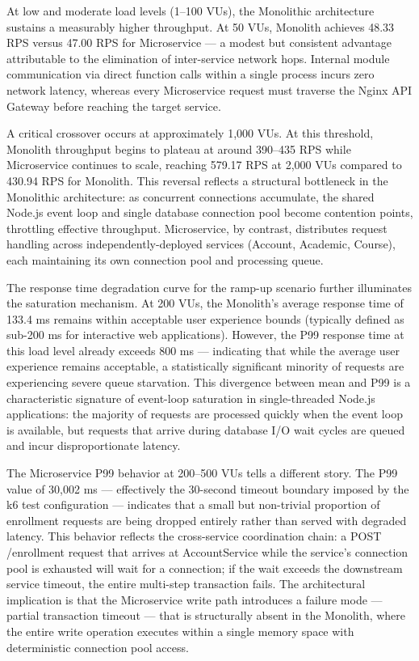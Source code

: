 At low and moderate load levels (1–100 VUs), the Monolithic architecture sustains a measurably higher throughput. At 50 VUs, Monolith achieves 48.33 RPS versus 47.00 RPS for Microservice — a modest but consistent advantage attributable to the elimination of inter-service network hops. Internal module communication via direct function calls within a single process incurs zero network latency, whereas every Microservice request must traverse the Nginx API Gateway before reaching the target service.

A critical crossover occurs at approximately 1,000 VUs. At this threshold, Monolith throughput begins to plateau at around 390–435 RPS while Microservice continues to scale, reaching 579.17 RPS at 2,000 VUs compared to 430.94 RPS for Monolith. This reversal reflects a structural bottleneck in the Monolithic architecture: as concurrent connections accumulate, the shared Node.js event loop and single database connection pool become contention points, throttling effective throughput. Microservice, by contrast, distributes request handling across independently-deployed services (Account, Academic, Course), each maintaining its own connection pool and processing queue.

The response time degradation curve for the ramp-up scenario further illuminates the saturation mechanism. At 200 VUs, the Monolith's average response time of 133.4 ms remains within acceptable user experience bounds (typically defined as sub-200 ms for interactive web applications). However, the P99 response time at this load level already exceeds 800 ms — indicating that while the average user experience remains acceptable, a statistically significant minority of requests are experiencing severe queue starvation. This divergence between mean and P99 is a characteristic signature of event-loop saturation in single-threaded Node.js applications: the majority of requests are processed quickly when the event loop is available, but requests that arrive during database I/O wait cycles are queued and incur disproportionate latency.

The Microservice P99 behavior at 200–500 VUs tells a different story. The P99 value of 30,002 ms — effectively the 30-second timeout boundary imposed by the k6 test configuration — indicates that a small but non-trivial proportion of enrollment requests are being dropped entirely rather than served with degraded latency. This behavior reflects the cross-service coordination chain: a POST /enrollment request that arrives at AccountService while the service's connection pool is exhausted will wait for a connection; if the wait exceeds the downstream service timeout, the entire multi-step transaction fails. The architectural implication is that the Microservice write path introduces a failure mode — partial transaction timeout — that is structurally absent in the Monolith, where the entire write operation executes within a single memory space with deterministic connection pool access.

